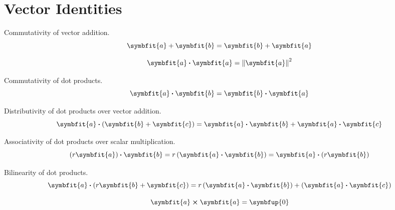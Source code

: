 \documentclass{article}
\begin{document}
\section{Vector Identities}
	\begin{theorem}
		Commutativity of vector addition.
		\begin{equation*}
			\symbfit{a} + \symbfit{b} = \symbfit{b} + \symbfit{a}
		\end{equation*}
	\end{theorem}
	\begin{theorem}
		\begin{equation*}
			\symbfit{a}\vdot\symbfit{a}=\norm{\symbfit{a}}^2
		\end{equation*}
	\end{theorem}
	\begin{theorem}
		Commutativity of dot products.
		\begin{equation*}
			\symbfit{a}\vdot \symbfit{b} = \symbfit{b}\vdot \symbfit{a}
		\end{equation*}
	\end{theorem}
	\begin{theorem}
		Distributivity of dot products over vector addition.
		\begin{equation*}
			\symbfit{a}\vdot \left(\symbfit{b}+\symbfit{c}\right) = \symbfit{a}\vdot\symbfit{b} + \symbfit{a}\vdot\symbfit{c}
		\end{equation*}
	\end{theorem}
	\begin{theorem}
		Associativity of dot products over scalar multiplication.
		\begin{equation*}
			\left(r\symbfit{a}\right)\vdot\symbfit{b} = r\left(\symbfit{a}\vdot\symbfit{b}\right)=\symbfit{a}\vdot\left(r\symbfit{b}\right)
		\end{equation*}
	\end{theorem}
	\begin{theorem}
		Bilinearity of dot products.
		\begin{equation*}
			\symbfit{a}\vdot\left(r\symbfit{b}+\symbfit{c}\right)=r\left(\symbfit{a}\vdot\symbfit{b}\right)+\left(\symbfit{a}\vdot\symbfit{c}\right)
		\end{equation*}
	\end{theorem}
	\begin{theorem}
		\begin{equation*}
			\symbfit{a}\cross \symbfit{a} = \symbfup{0}
		\end{equation*}
	\end{theorem}
\end{document}
